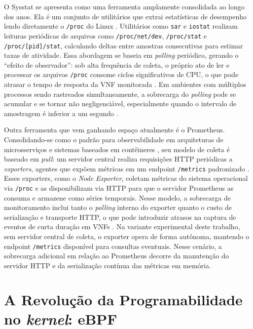 O Sysstat se apresenta como uma ferramenta amplamente consolidada ao longo dos anos. Ela é um conjunto de utilitários que extrai estatísticas de desempenho lendo diretamente o \texttt{/proc} do Linux \cite{godard2024sysstat}. Utilitários como \texttt{sar} e \texttt{iostat} realizam leituras periódicas de arquivos como \texttt{/proc/net/dev}, \texttt{/proc/stat} e \texttt{/proc/[pid]/stat}, calculando deltas entre amostras consecutivas para estimar taxas de atividade. Essa abordagem se baseia em \textit{polling} periódico, gerando o ``efeito de observador'': sob alta frequência de coleta, o próprio ato de ler e processar os arquivos \texttt{/proc} consome ciclos significativos de CPU, o que pode atrasar o tempo de resposta da VNF monitorada \cite{10.1109/NOMS47738.2020.9110434}. Em ambientes com múltiplos processos sendo rastreados simultaneamente, a sobrecarga do \textit{polling} pode se acumular e se tornar não negligenciável, especialmente quando o intervalo de amostragem é inferior a um segundo \cite{10.1145/3452296.3472888}.

Outra ferramenta que vem ganhando espaço atualmente é o Prometheus. Consolidando-se como o padrão para observabilidade em arquiteturas de microsserviços e sistemas baseados em contêineres \cite{turnbull_prometheus_2018, usman_observability_2022}, seu modelo de coleta é baseado em \textit{pull}: um servidor central realiza requisições HTTP periódicas a \textit{exporters}, agentes que expõem métricas em um endpoint \texttt{/metrics} padronizado \cite{usman_observability_2022}. Esses exporters, como o \textit{Node Exporter}, coletam métricas do sistema operacional via \texttt{/proc} e as disponibilizam via HTTP para que o servidor Prometheus as consuma e armazene como séries temporais. Nesse modelo, a sobrecarga de monitoramento inclui tanto o \textit{polling} interno do exporter quanto o custo de serialização e transporte HTTP, o que pode introduzir atrasos na captura de eventos de curta duração em VNFs \cite{10.1109/NOMS47738.2020.9110434}. Na variante experimental deste trabalho, sem servidor central de coleta, o exporter opera de forma autônoma, mantendo o endpoint \texttt{/metrics} disponível para consultas eventuais. Nesse cenário, a sobrecarga adicional em relação ao Prometheus decorre da manutenção do servidor HTTP e da serialização contínua das métricas em memória.

\section{A Revolução da Programabilidade no \textit{kernel}: eBPF}
\label{sec:ebpf}

